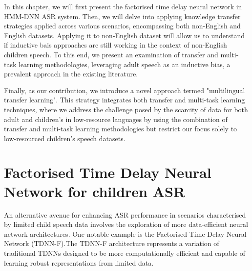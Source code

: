 In this chapter, we will first present the factorised time delay neural network in HMM-DNN ASR system. Then, we will delve into applying knowledge transfer strategies applied across various scenarios, encompassing both non-English and English datasets. Applying it to non-English dataset will allow us to understand if inductive bais approaches are still working in the context of non-English children speech. To this end, we present an examination of transfer and multi-task learning methodologies, leveraging adult speech as an inductive bias, a prevalent approach in the existing literature. 

Finally, as our contribution, we introduce a novel approach termed "multilingual transfer learning". This strategy integrates both transfer and multi-task learning techniques, where we address the challenge posed by the scarcity of data for both adult and children's in low-resource languages by using the combination of transfer and multi-task learning methodologies but restrict our focus solely to low-resourced  children's speech datasets.

\section{Factorised Time Delay Neural Network for children ASR}
An alternative avenue for enhancing ASR performance in scenarios characterised by limited child speech data involves the exploration of more data-efficient neural network architectures. One notable example is the Factorised Time-Delay Neural Network (TDNN-F).The TDNN-F architecture represents a variation of traditional TDNNs designed to be more computationally efficient and capable of learning robust representations from limited data. 

